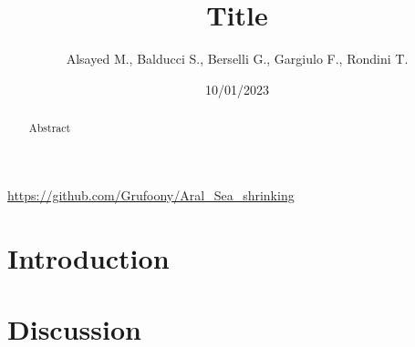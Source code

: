\documentclass[12pt,a4paper]{article}
\title{Title}
\author{Alsayed M., Balducci S., Berselli G., Gargiulo F., Rondini T.}
\date{10/01/2023}
\begin{document}
\maketitle
\begin{center}
	\url{https://github.com/Grufoony/Aral_Sea_shrinking}
\end{center}

\begin{abstract}
    Abstract
\end{abstract}
\thispagestyle{empty}

\newpage
\thispagestyle{empty}
\addtocounter{page}{-2}
\mbox{}

\tableofcontents
\pagebreak

\section*{Introduction}

\pagebreak

\section{Discussion}


\newpage
\thispagestyle{empty}
\mbox{}

\appendix
\end{document}
